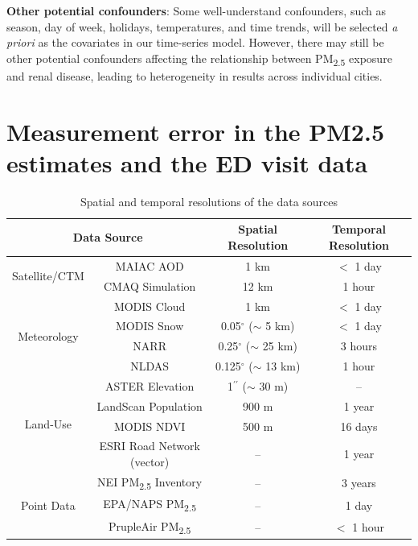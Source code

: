 \documentclass[11pt]{article}
\newcommand{\tsub}{\textsubscript}
\begin{document}
\begin{enumerate*}[{[1)]}]
    \item \textbf{Other potential confounders}: Some well-understand confounders, such as season, day of week, holidays, temperatures, and time trends, will be selected \textit{a priori} as the covariates in our time-series model. However, there may still be other potential confounders affecting the relationship between PM\tsub{2.5} exposure and renal disease, leading to heterogeneity in results across individual cities. 
\end{enumerate*}

\section{Measurement error in the PM2.5 estimates and the ED visit data}

\newpage
\begin{table}[H]
    \centering
    \caption{Spatial and temporal resolutions of the data sources}
    \begin{tabular}{c|c|c|c}
        \hline
        \multicolumn{2}{c|}{Data Source} & Spatial Resolution & Temporal Resolution \\
        \hline
        \multirow{2}{*}{Satellite/CTM} & MAIAC AOD & 1 km & $<$ 1 day \\
        & CMAQ Simulation & 12 km & 1 hour \\
        \hline
        \multirow{4}{*}{Meteorology} & MODIS Cloud & 1 km & $<$ 1 day \\
        & MODIS Snow & 0.05$^{\circ}$ ($\sim$ 5 km) & $<$ 1 day \\
        & NARR & 0.25$^{\circ}$ ($\sim$ 25 km) & 3 hours\\
        & NLDAS & 0.125$^{\circ}$ ($\sim$ 13 km) & 1 hour \\
        \hline
        \multirow{4}{*}{Land-Use} & ASTER Elevation & 1$^{\prime\prime}$ ($\sim$ 30 m) & -- \\
        & LandScan Population & 900 m & 1 year \\
        & MODIS NDVI & 500 m & 16 days \\
        & ESRI Road Network (vector) & -- & 1 year \\
        \hline
        \multirow{3}{*}{Point Data} & NEI PM\tsub{2.5} Inventory  & -- & 3 years \\
        & EPA/NAPS PM\tsub{2.5} & -- & 1 day \\
        & PrupleAir PM\tsub{2.5} & -- & $<$ 1 hour \\
        \hline
    \end{tabular}
    \label{tab:res}
\end{table}
\end{document}
